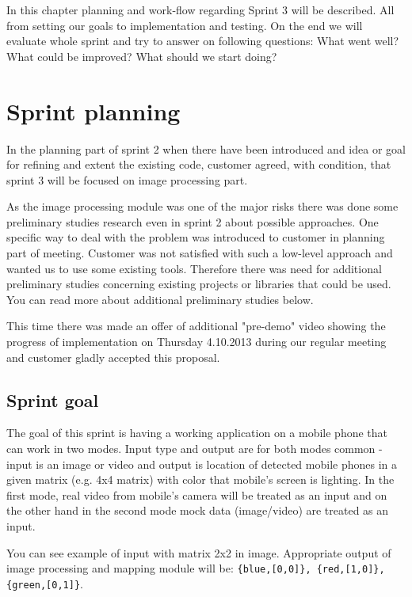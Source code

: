 In this chapter planning and work-flow regarding Sprint 3 will be described. 
All from setting our goals to implementation and testing. On the end we will evaluate whole sprint and try to answer on following questions: What went well? What could be improved? What should we start doing?  

\section{Sprint planning}
In the planning part of sprint 2 when there have been introduced and idea or goal for refining and extent the existing code, customer agreed, with condition, that sprint 3 will be focused on image processing part.

As the image processing module was one of the major risks there was done some preliminary studies research even in sprint 2 about possible approaches.
One specific way to deal with the problem was introduced to customer in planning part of meeting.
Customer was not satisfied with such a low-level approach and wanted us to use some existing tools.
Therefore there was need for additional preliminary studies concerning existing projects or libraries that could be used.
You can read more about additional preliminary studies below.

This time there was made an offer of additional "pre-demo" video showing the progress of implementation on Thursday 4.10.2013 during our regular meeting and customer gladly accepted this proposal.

\subsection{Sprint goal}
The goal of this sprint is having a working application on a mobile phone that can work in two modes.  
Input type and output are for both modes common - input is an image or video and output is location of detected mobile phones in a given matrix (e.g. 4x4 matrix) with color that mobile's screen is lighting.
In the first mode, real video from mobile's camera will be treated as an input and on the other hand in the second mode mock data (image/video) are treated as an input.

You can see example of input with matrix 2x2 in image. Appropriate output of image processing and mapping module will be: \texttt{\{blue,[0,0]\}, \{red,[1,0]\}, \{green,[0,1]\}}.

